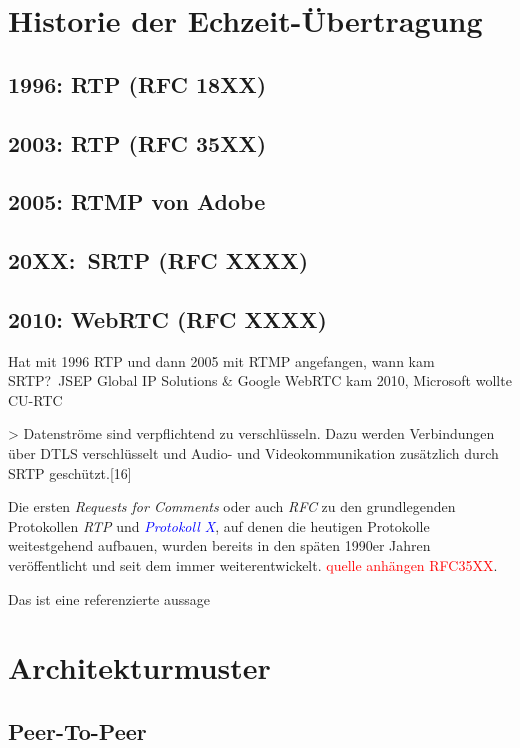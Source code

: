 \documentclass[journal]{IEEEtran}
\begin{document}
\section{Historie der Echzeit-Übertragung}

\subsection{1996: RTP (RFC 18XX)}
\subsection{2003: RTP (RFC 35XX)}
\subsection{2005: RTMP von Adobe}
\subsection{20XX:\ SRTP (RFC XXXX)}
\subsection{2010: WebRTC (RFC XXXX)}

Hat mit 1996 RTP und dann 2005 mit RTMP angefangen, wann kam SRTP?\ JSEP
Global IP Solutions \& Google WebRTC kam 2010, Microsoft wollte CU-RTC

> Datenströme sind verpflichtend zu verschlüsseln. Dazu werden Verbindungen über DTLS verschlüsselt und Audio- und Videokommunikation zusätzlich durch SRTP geschützt.[16]


Die ersten \textit{Requests for Comments} oder auch \textit{RFC} zu
den grundlegenden Protokollen \textit{RTP} und
\textit{\textcolor{blue}{Protokoll X}}, auf denen die heutigen Protokolle
weitestgehend aufbauen, wurden bereits in den späten 1990er Jahren
veröffentlicht und seit dem immer weiterentwickelt. \textcolor{red}{quelle
anhängen RFC35XX}.

\lipsum[1-3][3-30]


Das ist eine referenzierte aussage\cite{WebRTC}

\section{Architekturmuster}
\lipsum[1-4][1-10]

\subsection{Peer-To-Peer}
\lipsum[1-2][2-3]
\end{document}
